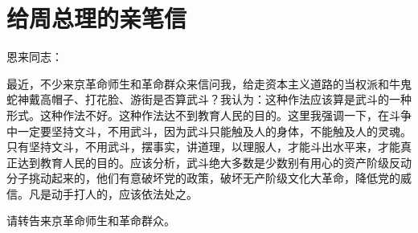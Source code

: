 \section[给周总理的亲笔信（一九六六年十二月二十七日）]{给周总理的亲笔信}


恩来同志：

最近，不少来京革命师生和革命群众来信问我，给走资本主义道路的当权派和牛鬼蛇神戴高帽子、打花脸、游街是否算武斗？我认为：这种作法应该算是武斗的一种形式。这种作法不好。这种作法达不到教育人民的目的。这里我强调一下，在斗争中一定要坚持文斗，不用武斗，因为武斗只能触及人的身体，不能触及人的灵魂。只有坚持文斗，不用武斗，摆事实，讲道理，以理服人，才能斗出水平来，才能真正达到教育人民的目的。应该分析，武斗绝大多数是少数别有用心的资产阶级反动分子挑动起来的，他们有意破坏党的政策，破坏无产阶级文化大革命，降低党的威信。凡是动手打人的，应该依法处之。

请转告来京革命师生和革命群众。



